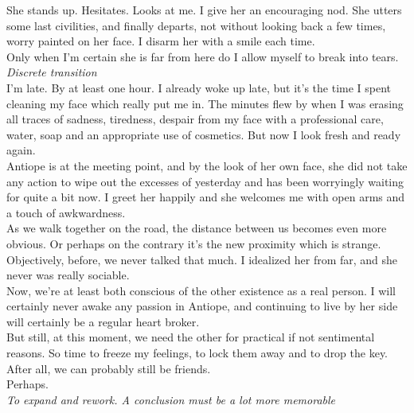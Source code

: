 \documentclass{report}
\newcommand{\dcomment}[1]{
	\emph{#1}
	\\
}
\begin{document}
She stands up. Hesitates. Looks at me. I give her an encouraging nod. She utters some last civilities, and finally departs, not without looking back a few times, worry painted on her face. I disarm her with a smile each time.\\

Only when I'm certain she is far from here do I allow myself to break into tears.\\

\dcomment{
	Discrete transition
}

I'm late. By at least one hour. I already woke up late, but it's the time I spent cleaning my face which really put me in. The minutes flew by when I was erasing all traces of sadness, tiredness, despair from my face with a professional care, water, soap and an appropriate use of cosmetics. But now I look fresh and ready again.\\

Antiope is at the meeting point, and by the look of her own face, she did not take any action to wipe out the excesses of yesterday and has been worryingly waiting for quite a bit now. I greet her happily and she welcomes me with open arms and a touch of awkwardness.\\

As we walk together on the road, the distance between us becomes even more obvious. Or perhaps on the contrary it's the new proximity which is strange. Objectively, before, we never talked that much. I idealized her from far, and she never was really sociable.\\

Now, we're at least both conscious of the other existence as a real person. I will certainly never awake any passion in Antiope, and continuing to live by her side will certainly be a regular heart broker.\\

But still, at this moment, we need the other for practical if not sentimental reasons. So time to freeze my feelings, to lock them away and to drop the key.\\

After all, we can probably still be friends.\\

Perhaps.\\

\dcomment{
	To expand and rework. A conclusion must be a lot more memorable
}
\end{document}
